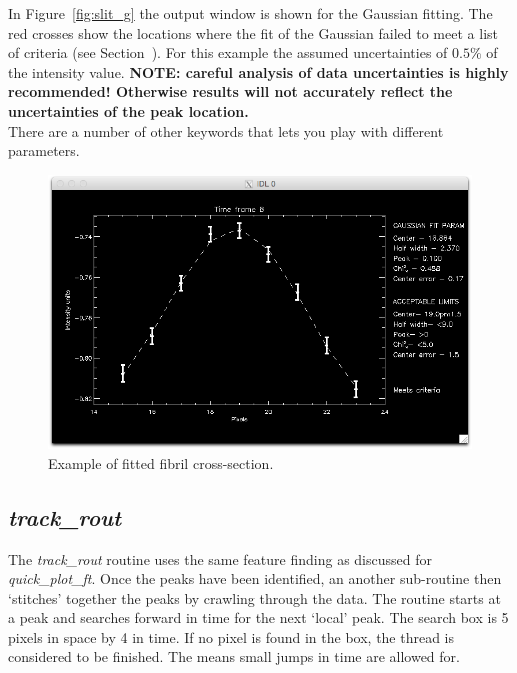 \documentclass{article}
\begin{document}
 In Figure~\ref{fig:slit_g} the output window is shown for the Gaussian fitting. The red crosses show the locations where the fit of the Gaussian failed to meet a list of 
 criteria (see Section~). For this example the assumed uncertainties of $0.5\%$ of the intensity value. \textbf{NOTE: careful analysis of data uncertainties is highly 
 recommended! Otherwise results will not accurately reflect the uncertainties of the peak location.} \\

There are a number of other keywords that lets you play with different parameters.

\begin{figure}[!tp]
\centering

\includegraphics[scale=0.6, clip=true, viewport=0.5cm 0.cm 29.cm 16.7cm]{gauss_fit_example.png}  

\caption{Example of fitted fibril cross-section. 
}\label{fig:fit_g}
\end{figure}

 
\subsection{\textit{track\_rout}}

The \textit{track\_rout} routine uses the same feature finding as discussed for \textit{quick\_plot\_ft}. 
Once the peaks have been identified, an another sub-routine then `stitches' together the peaks by 
crawling through the data. The routine starts at a peak and searches forward in time for the next `local' 
peak. The search box is 5 pixels in space by 4 in time. If no pixel is found in the box, the thread is 
considered to be finished. The means small jumps in time are allowed for. \\
\end{document}
